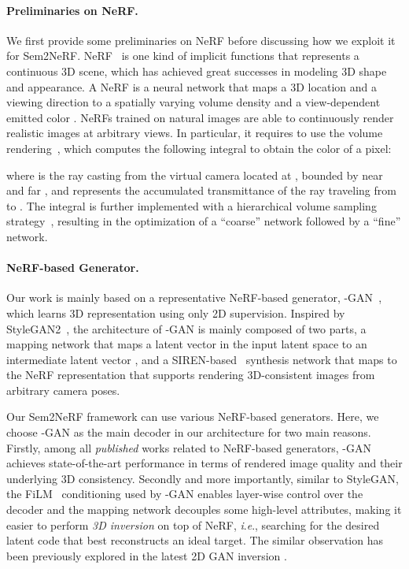 \documentclass[runningheads]{llncs}
\newcommand{\ie}{\textit{i}.\textit{e}.}
\begin{document}
\paragraph{\textbf{Preliminaries on NeRF.}} We first provide some preliminaries on NeRF before discussing how we exploit it for Sem2NeRF. NeRF~\cite{mildenhall2020nerf} is one kind of implicit functions that represents a continuous 3D scene, which has achieved great successes in modeling 3D shape and appearance. A NeRF is a neural network that maps a 3D location  and a viewing direction  to a spatially varying volume density  and a view-dependent emitted color . NeRFs trained on natural images are able to continuously render realistic images at arbitrary views. In particular, it requires to use the volume rendering~\cite{levoy1990efficient}, which computes the following integral to obtain the color of a pixel:

where  is the ray casting from the virtual camera located at , bounded by near  and far , and  represents the accumulated transmittance of the ray traveling from  to . The integral  is further implemented with a hierarchical volume sampling strategy~\cite{levoy1990efficient,mildenhall2020nerf}, resulting in the optimization of a ``coarse'' network followed by a ``fine'' network.

\paragraph{\textbf{NeRF-based Generator.}} Our work is mainly based on a representative NeRF-based generator, -GAN~\cite{chan2021pi}, which learns 3D representation using only 2D supervision. Inspired by StyleGAN2~\cite{karras2020analyzing}, the architecture of -GAN is mainly composed of two parts, a mapping network  that maps a latent vector  in the input latent space  to an intermediate latent vector , and a SIREN-based~\cite{sitzmann2020implicit} synthesis network that maps  to the NeRF representation  that supports rendering 3D-consistent images from arbitrary camera poses.

Our Sem2NeRF framework can use various NeRF-based generators. Here, we choose -GAN as the main decoder in our architecture for two main reasons. Firstly, among all \emph{published} works related to NeRF-based generators, -GAN achieves state-of-the-art performance in terms of rendered image quality and their underlying 3D consistency. Secondly and more importantly, similar to StyleGAN, the FiLM~\cite{perez2018film} conditioning used by -GAN enables layer-wise control over the decoder and the mapping network decouples some high-level attributes, making it easier to perform \emph{3D inversion} on top of NeRF, \ie, searching for the desired latent code  that best reconstructs an ideal target. The similar observation has been previously explored in the latest 2D GAN inversion \cite{collins2020editing,karras2020analyzing,richardson2021encoding}.
\end{document}
